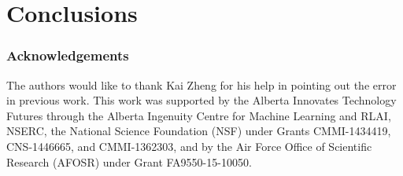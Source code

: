 \documentclass[twoside, 11pt]{article}
\begin{document}
\section{Conclusions}
\label{sec:conc}


\appendix




\subsubsection*{Acknowledgements}
The authors would like to thank Kai Zheng for his help in pointing out the error in previous work.
This work was supported by the Alberta Innovates Technology Futures through the Alberta Ingenuity Centre for Machine Learning and RLAI, NSERC, the National Science Foundation (NSF) under Grants CMMI-1434419, CNS-1446665, and CMMI-1362303, and by the Air Force Office of Scientific Research (AFOSR) under Grant FA9550-15-10050.

%


\end{document}

